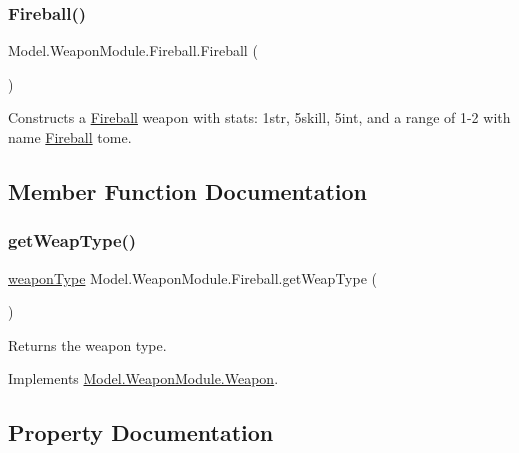 \subsubsection{\texorpdfstring{Fireball()}{Fireball()}}
{\footnotesize\ttfamily Model.\+Weapon\+Module.\+Fireball.\+Fireball (\begin{DoxyParamCaption}{ }\end{DoxyParamCaption})\hspace{0.3cm}{\ttfamily [inline]}}

Constructs a \hyperlink{class_model_1_1_weapon_module_1_1_fireball}{Fireball} weapon with stats\+: 1str, 5skill, 5int, and a range of 1-\/2 with name \hyperlink{class_model_1_1_weapon_module_1_1_fireball}{Fireball} tome. 

\subsection{Member Function Documentation}
\hypertarget{class_model_1_1_weapon_module_1_1_fireball_aa979cf9b7c07e36b3fb55ee6d6a43e8b}{}\label{class_model_1_1_weapon_module_1_1_fireball_aa979cf9b7c07e36b3fb55ee6d6a43e8b} 
\subsubsection{\texorpdfstring{get\+Weap\+Type()}{getWeapType()}}
{\footnotesize\ttfamily \hyperlink{namespace_model_1_1_weapon_module_a3390c266f89e3399c2bc7fa31f13cbec}{weapon\+Type} Model.\+Weapon\+Module.\+Fireball.\+get\+Weap\+Type (\begin{DoxyParamCaption}{ }\end{DoxyParamCaption})\hspace{0.3cm}{\ttfamily [inline]}}

Returns the weapon type. 

Implements \hyperlink{interface_model_1_1_weapon_module_1_1_weapon_a175133855ef446d3d87c70d13979be9c}{Model.\+Weapon\+Module.\+Weapon}.



\subsection{Property Documentation}
\hypertarget{class_model_1_1_weapon_module_1_1_fireball_a6c217e1fc8978051c53270ae8fcb545a}{}\label{class_model_1_1_weapon_module_1_1_fireball_a6c217e1fc8978051c53270ae8fcb545a} 
